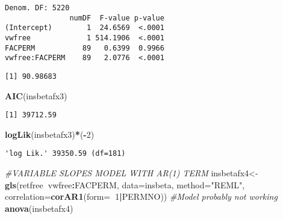\documentclass[]{book}
\newenvironment{Shaded}{\begin{snugshade}}{\end{snugshade}}
\newcommand{\CommentTok}[1]{\textcolor[rgb]{0.56,0.35,0.01}{\textit{#1}}}
\newcommand{\DataTypeTok}[1]{\textcolor[rgb]{0.13,0.29,0.53}{#1}}
\newcommand{\DecValTok}[1]{\textcolor[rgb]{0.00,0.00,0.81}{#1}}
\newcommand{\KeywordTok}[1]{\textcolor[rgb]{0.13,0.29,0.53}{\textbf{#1}}}
\newcommand{\NormalTok}[1]{#1}
\newcommand{\OperatorTok}[1]{\textcolor[rgb]{0.81,0.36,0.00}{\textbf{#1}}}
\newcommand{\StringTok}[1]{\textcolor[rgb]{0.31,0.60,0.02}{#1}}
\begin{document}
\begin{verbatim}
Denom. DF: 5220 
               numDF  F-value p-value
(Intercept)        1  24.6569  <.0001
vwfree             1 514.1906  <.0001
FACPERM           89   0.6399  0.9966
vwfree:FACPERM    89   2.0776  <.0001
\end{verbatim}

\begin{Shaded}
\end{Shaded}

\begin{verbatim}
[1] 90.98683
\end{verbatim}

\begin{Shaded}
\begin{Highlighting}[]
\KeywordTok{AIC}\NormalTok{(insbetafx3)}
\end{Highlighting}
\end{Shaded}

\begin{verbatim}
[1] 39712.59
\end{verbatim}

\begin{Shaded}
\begin{Highlighting}[]
\KeywordTok{logLik}\NormalTok{(insbetafx3)}\OperatorTok{*}\NormalTok{(}\OperatorTok{-}\DecValTok{2}\NormalTok{)}
\end{Highlighting}
\end{Shaded}

\begin{verbatim}
'log Lik.' 39350.59 (df=181)
\end{verbatim}

\begin{Shaded}
\begin{Highlighting}[]
\CommentTok{#VARIABLE SLOPES MODEL WITH AR(1) TERM}
\NormalTok{insbetafx4<-}\KeywordTok{gls}\NormalTok{(retfree}\OperatorTok{~}\NormalTok{vwfree}\OperatorTok{:}\NormalTok{FACPERM, }\DataTypeTok{data=}\NormalTok{insbeta, }\DataTypeTok{method=}\StringTok{"REML"}\NormalTok{, }\DataTypeTok{correlation=}\KeywordTok{corAR1}\NormalTok{(}\DataTypeTok{form=}\OperatorTok{~}\DecValTok{1}\OperatorTok{|}\NormalTok{PERMNO)) }\CommentTok{#Model probably not working}
\KeywordTok{anova}\NormalTok{(insbetafx4)}
\end{Highlighting}
\end{Shaded}
\end{document}
